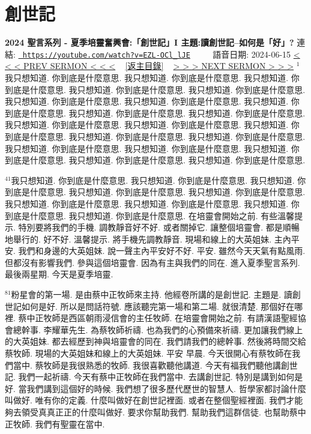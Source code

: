 \documentclass{book}
\begin{document}
\section{創世記}
\label{sec:EZL_OCl_lJE}
\textbf{2024 聖言系列 - 夏季培靈奮興會:「創世記」I 主題:讀創世記–如何是「好」?}
\newline
\newline
連結: \href{https://youtube.com/watch?v=EZL-OCl_lJE}{\texttt{ https://youtube.com/watch?v=EZL-OCl\_lJE}} ~~~~ 語音日期: 2024-06-15 
\newline
\newline
\hyperref[sec:dqXyjOETQK4]{\small{< < < PREV SERMON < < <}}
~
\hyperref[sec:index]{\small{[返主目錄]}}
~
\hyperref[sec:R54GUORH3eY]{\small{> > > NEXT SERMON > > >}}
\newline
\newline
$^{1}$我只想知道.
你到底是什麼意思.
我只想知道.
你到底是什麼意思.
我只想知道.
你到底是什麼意思.
我只想知道.
你到底是什麼意思.
我只想知道.
你到底是什麼意思.
我只想知道.
你到底是什麼意思.
我只想知道.
你到底是什麼意思.
我只想知道.
你到底是什麼意思.
我只想知道.
你到底是什麼意思.
我只想知道.
你到底是什麼意思.
我只想知道.
你到底是什麼意思.
我只想知道.
你到底是什麼意思.
我只想知道.
你到底是什麼意思.
我只想知道.
你到底是什麼意思.
我只想知道.
你到底是什麼意思.
我只想知道.
你到底是什麼意思.
我只想知道.
你到底是什麼意思.
我只想知道.
你到底是什麼意思.
我只想知道.
你到底是什麼意思.
我只想知道.
你到底是什麼意思.

$^{41}$我只想知道.
你到底是什麼意思.
我只想知道.
你到底是什麼意思.
我只想知道.
你到底是什麼意思.
我只想知道.
你到底是什麼意思.
我只想知道.
你到底是什麼意思.
我只想知道.
你到底是什麼意思.
我只想知道.
你到底是什麼意思.
我只想知道.
你到底是什麼意思.
我只想知道.
你到底是什麼意思.
在培靈會開始之前.
有些溫馨提示.
特別要將我們的手機.
調教靜音好不好.
或者關掉它.
讓整個培靈會.
都是順暢地舉行的.
好不好.
溫馨提示.
將手機先調教靜音.
現場和線上的大英姐妹.
主內平安.
我們和身邊的大英姐妹.
說一聲主內平安好不好.
平安.
雖然今天天氣有點風雨.
但都沒有影響我們.
參與這個培靈會.
因為有主與我們的同在.
進入夏季聖言系列.
最後兩星期.
今天是夏季培靈.

$^{81}$粉星會的第一場.
是由蔡中正牧師來主持.
他經卷所講的是創世記.
主題是.
讀創世記如何是好.
所以是問話符號.
應該聽完第一場和第二場.
就很清楚.
那個好在哪裡.
蔡中正牧師是西區朝雨浸信會的主任牧師.
在培靈會開始之前.
有請漢語聖經協會總幹事.
李耀華先生.
為蔡牧師祈禱.
也為我們的心預備來祈禱.
更加讓我們線上的大英姐妹.
都去經歷到神與培靈會的同在.
我們請我們的總幹事.
然後將時間交給蔡牧師.
現場的大英姐妹和線上的大英姐妹.
平安 早晨.
今天很開心有蔡牧師在我們當中.
蔡牧師是我很熟悉的牧師.
我很喜歡聽他講道.
今天有福我們聽他講創世記.
我們一起祈禱.
今天有蔡中正牧師在我們當中.
去講創世記.
特別是講到如何是好.
當我們講到這個好的時候.
我們想了很多歷代歷世的智慧人.
哲學家都討論什麼叫做好.
唯有你的定義.
什麼叫做好在創世記裡面.
或者在整個聖經裡面.
我們才能夠去領受真真正正的什麼叫做好.
要求你幫助我們.
幫助我們這群信徒.
也幫助蔡中正牧師.
我們有聖靈在當中.
\end{document}
